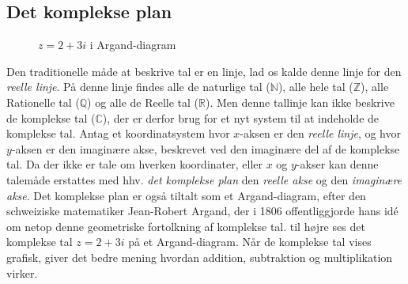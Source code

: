 \documentclass{article}
\begin{document}
\subsection{Det komplekse plan}
\begin{figure}
\caption{$z=2+3i$ i Argand-diagram}\label{wrap-fig:5}
\end{figure} 
Den traditionelle måde at beskrive tal er en linje, lad os kalde denne linje for den \textit{reelle linje}. På denne linje findes alle de naturlige tal ($\mathbb{N}$), alle hele tal ($\mathbb{Z}$), alle Rationelle tal ($\mathbb{Q}$) og alle de Reelle tal ($\mathbb{R}$). Men denne tallinje kan ikke beskrive de komplekse tal ($\mathbb{C}$), der er derfor brug for et nyt system til at indeholde de komplekse tal. Antag et koordinatsystem hvor $x$-aksen er den \textit{reelle linje}, og hvor $y$-aksen er den imaginære akse, beskrevet ved den imaginære del af de komplekse tal. Da der ikke er tale om hverken koordinater, eller $x$ og $y$-akser kan denne talemåde erstattes med hhv. \textit{det komplekse plan} den \textit{reelle akse} og den \textit{imaginære akse}. Det komplekse plan er også tiltalt som et Argand-diagram, efter den schweiziske matematiker Jean-Robert Argand, der i 1806 offentliggjorde hans idé om netop denne geometriske fortolkning af komplekse tal. til højre ses det komplekse tal $z=2+3i$ på et Argand-diagram. Når de komplekse tal vises grafisk, giver det bedre mening hvordan addition, subtraktion og multiplikation virker.
\newpage
\end{document}
